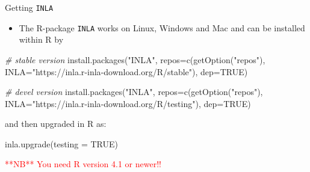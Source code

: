 \documentclass[
  ignorenonframetext,
]{beamer}
\newenvironment{Shaded}{\begin{snugshade}}{\end{snugshade}}
\newcommand{\AttributeTok}[1]{\textcolor[rgb]{0.77,0.63,0.00}{#1}}
\newcommand{\CommentTok}[1]{\textcolor[rgb]{0.56,0.35,0.01}{\textit{#1}}}
\newcommand{\ConstantTok}[1]{\textcolor[rgb]{0.00,0.00,0.00}{#1}}
\newcommand{\FunctionTok}[1]{\textcolor[rgb]{0.00,0.00,0.00}{#1}}
\newcommand{\NormalTok}[1]{#1}
\newcommand{\StringTok}[1]{\textcolor[rgb]{0.31,0.60,0.02}{#1}}
\providecommand{\tightlist}{%
  \setlength{\itemsep}{0pt}\setlength{\parskip}{0pt}}
\begin{document}
\begin{frame}[fragile]{Getting \texttt{INLA}}
\protect\hypertarget{getting-inla-2}{}
\begin{itemize}
\tightlist
\item
  The R-package \texttt{INLA} works on Linux, Windows and Mac and can be
  installed within R by
\end{itemize}

\footnotesize

\begin{Shaded}
\begin{Highlighting}[]
\CommentTok{\# stable version}
\FunctionTok{install.packages}\NormalTok{(}\StringTok{"INLA"}\NormalTok{,}
          \AttributeTok{repos=}\FunctionTok{c}\NormalTok{(}\FunctionTok{getOption}\NormalTok{(}\StringTok{"repos"}\NormalTok{),}
          \AttributeTok{INLA=}\StringTok{"https://inla.r{-}inla{-}download.org/R/stable"}\NormalTok{),}
          \AttributeTok{dep=}\ConstantTok{TRUE}\NormalTok{)}

\CommentTok{\# devel version }
\FunctionTok{install.packages}\NormalTok{(}\StringTok{"INLA"}\NormalTok{,}
        \AttributeTok{repos=}\FunctionTok{c}\NormalTok{(}\FunctionTok{getOption}\NormalTok{(}\StringTok{"repos"}\NormalTok{),}
        \AttributeTok{INLA=}\StringTok{"https://inla.r{-}inla{-}download.org/R/testing"}\NormalTok{),}
        \AttributeTok{dep=}\ConstantTok{TRUE}\NormalTok{)}
\end{Highlighting}
\end{Shaded}

\normalsize

and then upgraded in R as:

\begin{Shaded}
\begin{Highlighting}[]
\FunctionTok{inla.upgrade}\NormalTok{(}\AttributeTok{testing =} \ConstantTok{TRUE}\NormalTok{)}
\end{Highlighting}
\end{Shaded}

\textcolor{red}{**NB** You need R version 4.1 or newer!!}
\end{frame}
\end{document}
